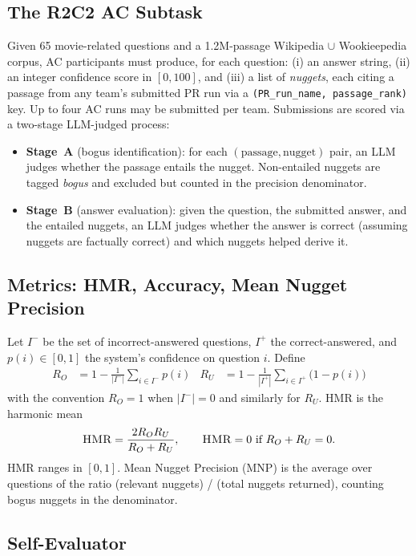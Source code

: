 \documentclass[11pt,a4paper]{article}
\newcommand{\HMR}{\textsc{HMR}}
\newcommand{\MNP}{\textsc{MNP}}
\begin{document}
\subsection{The R2C2 AC Subtask}

Given 65 movie-related questions and a 1.2M-passage Wikipedia $\cup$
Wookieepedia corpus, AC participants must produce, for each question:
(i) an answer string, (ii) an integer confidence score in $[0,100]$,
and (iii) a list of \emph{nuggets}, each citing a passage from any
team's submitted PR run via a \texttt{(PR\_run\_name, passage\_rank)}
key. Up to four AC runs may be submitted per team. Submissions are
scored via a two-stage LLM-judged process:

\begin{itemize}
  \item \textbf{Stage~A} (bogus identification): for each
    $(\text{passage}, \text{nugget})$ pair, an LLM judges whether the
    passage entails the nugget. Non-entailed nuggets are tagged
    \emph{bogus} and excluded but counted in the precision denominator.
  \item \textbf{Stage~B} (answer evaluation): given the question, the
    submitted answer, and the entailed nuggets, an LLM judges whether
    the answer is correct (assuming nuggets are factually correct) and
    which nuggets helped derive it.
\end{itemize}

\subsection{Metrics: HMR, Accuracy, Mean Nugget Precision}

Let $I^-$ be the set of incorrect-answered questions, $I^+$ the
correct-answered, and $p(i) \in [0,1]$ the system's confidence on
question $i$. Define
\begin{align}
  R_O &= 1 - \frac{1}{|I^-|}\sum_{i \in I^-} p(i)
  &
  R_U &= 1 - \frac{1}{|I^+|}\sum_{i \in I^+}\bigl(1-p(i)\bigr)
\end{align}
with the convention $R_O = 1$ when $|I^-|=0$ and similarly for $R_U$.
\HMR{} is the harmonic mean
\[
  \HMR = \frac{2 R_O R_U}{R_O + R_U}, \qquad \HMR=0 \text{ if } R_O+R_U=0.
\]
\HMR{} ranges in $[0,1]$. Mean Nugget Precision (\MNP) is the average
over questions of the ratio (relevant nuggets) / (total nuggets returned),
counting bogus nuggets in the denominator.

\subsection{Self-Evaluator}\label{sec:eval}
\end{document}
